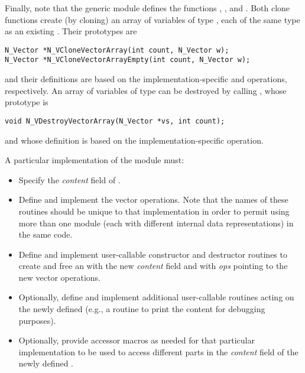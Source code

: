 Finally, note that the generic {\nvector} module defines the functions
,  , and
. Both clone functions create (by cloning) an array
of  variables of type , each of the same type as an
existing . Their prototypes are
\begin{verbatim}
N_Vector *N_VCloneVectorArray(int count, N_Vector w);
N_Vector *N_VCloneVectorArrayEmpty(int count, N_Vector w);
\end{verbatim}
and their definitions are based on the implementation-specific  and
 operations, respectively. An array of variables of
type  can be destroyed by calling ,
whose prototype is
\begin{verbatim}
void N_VDestroyVectorArray(N_Vector *vs, int count);
\end{verbatim}
and whose definition is based on the implementation-specific 
operation.


A particular implementation of the {\nvector} module must:
\begin{itemize}
\item Specify the {\em content} field of .
\item Define and implement the vector operations.
  Note that the names of these routines should be unique to that implementation in order
  to permit using more than one {\nvector} module (each with different 
  internal data representations) in the same code.
\item Define and implement user-callable constructor and destructor
  routines to create and free an  with
  the new {\em content} field and with {\em ops} pointing to the
  new vector operations.
\item Optionally, define and implement additional user-callable routines
  acting on the newly defined  (e.g., a routine to print
  the content for debugging purposes).
\item Optionally, provide accessor macros as needed for that particular implementation to
  be used to access different parts in the {\em content} field of the newly defined .
\end{itemize}

